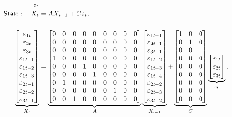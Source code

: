 \documentclass[a4paper,12pt]{article}
\begin{document}
\begin{align}
{}_{\varepsilon _{t}} \\
\mathsf{State}:\quad X_{t}& =AX_{t-1}+C\varepsilon _{t},  \notag \\[5mm]
\underbrace{%
\begin{bmatrix}
\varepsilon _{1t} \\ 
\varepsilon _{2t} \\ 
\varepsilon _{3t} \\ 
\varepsilon _{1t-1} \\ 
\varepsilon _{1t-2} \\ 
\varepsilon _{1t-3} \\ 
\varepsilon _{2t-1} \\ 
\varepsilon _{2t-2} \\ 
\varepsilon _{3t-1}%
\end{bmatrix}%
}_{X_{t}}& =\underbrace{%
\begin{bmatrix}
0 & 0 & 0 & 0 & 0 & 0 & 0 & 0 & 0 \\ 
0 & 0 & 0 & 0 & 0 & 0 & 0 & 0 & 0 \\ 
0 & 0 & 0 & 0 & 0 & 0 & 0 & 0 & 0 \\ 
1 & 0 & 0 & 0 & 0 & 0 & 0 & 0 & 0 \\ 
0 & 0 & 0 & 1 & 0 & 0 & 0 & 0 & 0 \\ 
0 & 0 & 0 & 0 & 1 & 0 & 0 & 0 & 0 \\ 
0 & 1 & 0 & 0 & 0 & 0 & 0 & 0 & 0 \\ 
0 & 0 & 0 & 0 & 0 & 0 & 1 & 0 & 0 \\ 
0 & 0 & 1 & 0 & 0 & 0 & 0 & 0 & 0%
\end{bmatrix}%
}_{A}\underbrace{%
\begin{bmatrix}
\varepsilon _{1t-1} \\ 
\varepsilon _{2t-1} \\ 
\varepsilon _{3t-1} \\ 
\varepsilon _{1t-2} \\ 
\varepsilon _{1t-3} \\ 
\varepsilon _{1t-4} \\ 
\varepsilon _{2t-2} \\ 
\varepsilon _{2t-3} \\ 
\varepsilon _{3t-2}%
\end{bmatrix}%
}_{X_{t-1}}+\underbrace{%
\begin{bmatrix}
1 & 0 & 0 \\ 
0 & 1 & 0 \\ 
0 & 0 & 1 \\ 
0 & 0 & 0 \\ 
0 & 0 & 0 \\ 
0 & 0 & 0 \\ 
0 & 0 & 0 \\ 
0 & 0 & 0 \\ 
0 & 0 & 0%
\end{bmatrix}%
}_{C}\underbrace{%
\begin{bmatrix}
\varepsilon _{1t} \\ 
\varepsilon _{2t} \\ 
\varepsilon _{3t}%
\end{bmatrix}%
}_{\varepsilon _{t}}.
\end{align}%
\esq\EAW
\end{document}
